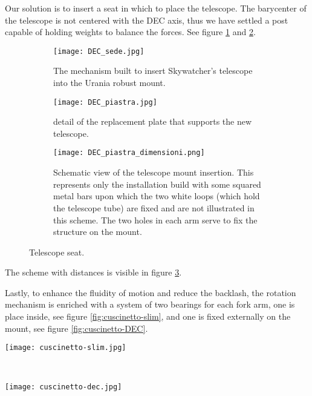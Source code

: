 Our solution is to insert a seat in which to place the telescope.
The barycenter of the telescope is not centered with the DEC axis, thus we have settled a post capable of holding weights to balance the forces.
See figure \ref{fig:piastra_DEC} and \ref{fig:piastra_particular}.
\begin{figure*}
    \begin{subfigure}[t!]
        {0.25\textwidth}
        \centering
        \texttt{[image: DEC\_sede.jpg]}
        \caption{The mechanism built to insert Skywatcher's telescope into the Urania robust mount.}
        \label{fig:piastra_DEC}
    \end{subfigure}
    \begin{subfigure}[t!]
        {0.25\textwidth}
        \centering
        \texttt{[image: DEC\_piastra.jpg]}
        \caption{detail of the replacement plate that supports the new telescope.}
        \label{fig:piastra_particular}
    \end{subfigure}
    \begin{subfigure}[t!]
        {0.5\textwidth}
        \centering
        \texttt{[image: DEC\_piastra\_dimensioni.png]}
        \caption{Schematic view of the telescope mount insertion.
        This represents only the installation build with some squared metal bars upon which the two white loops (which hold the telescope tube) are fixed and are not illustrated in this scheme. The two holes in each arm serve to fix the structure on the mount. }
        \label{fig:DEC_piastra_dimensioni}
    \end{subfigure}
    \caption{Telescope seat.}
    \label{fig:telescope-substitution}
\end{figure*}

The scheme with distances is visible in figure \ref{fig:DEC_piastra_dimensioni}.

Lastly, to enhance the fluidity of motion and reduce the backlash, the rotation mechanism is enriched with a system of two bearings for each fork arm, one is place inside, see figure \ref{fig:cuscinetto-slim}, and one is fixed externally on the mount, see figure \ref{fig:cuscinetto-DEC}.
\\
\begin{minipage}
    {.5\textwidth}
    \centering
    \texttt{[image: cuscinetto-slim.jpg]}
    \label{fig:cuscinetto-slim}
\end{minipage}
\\
\begin{minipage}
    {.5\textwidth}
    \centering
    \texttt{[image: cuscinetto-dec.jpg]}
    \label{fig:cuscinetto-DEC}
\end{minipage}

